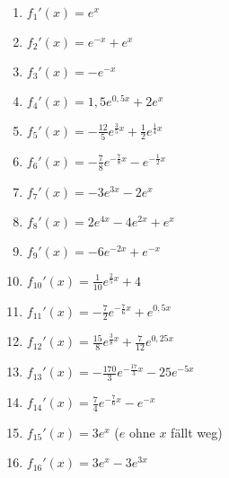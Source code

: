 \begin{Answer}[ref=efktAblA1]\\
	\begin{minipage}{\textwidth}
		\begin{minipage}{0.5\textwidth}
			\begin{enumerate}[label=\alph*)]
				\item \(f_1'(x)=e^x\)
				\item \(f_2'(x)=e^{-x}+e^x\)
				\item \(f_3'(x)=-e^{-x}\)
				\item \(f_4'(x)=1,5e^{0,5x}+2e^x\)
				\item \(f_5'(x)=-\frac{12}{5}e^{\frac{3}{5}x}+\frac{1}{2}e^{\frac{1}{4}x}\)
				\item \(f_6'(x)=-\frac{7}{8}e^{-\frac{7}{8}x}-e^{-\frac{1}{2}x}\)
				\item \(f_7'(x)=-3e^{3x}-2e^{x}\)
				\item \(f_8'(x)=2e^{4x}-4e^{2x}+e^x\)
			\end{enumerate}
		\end{minipage}
		\begin{minipage}{0.5\textwidth}
			\begin{enumerate}[label=\alph*)]
				\setcounter{enumi}{8}
				\item \(f_9'(x)=-6e^{-2x}+e^{-x}\)
				\item \(f_{10}'(x)=\frac{1}{10}e^{\frac{2}{5}x}+4\)
				\item \(f_{11}'(x)=-\frac{7}{2}e^{-\frac{7}{6}x}+e^{0,5x}\)
				\item \(f_{12}'(x)=\frac{15}{8}e^{\frac{3}{8}x}+\frac{7}{12}e^{0,25x}\)
				\item \(f_{13}'(x)=-\frac{170}{3}e^{-\frac{17}{3}x}-25e^{-5x}\)
				\item \(f_{14}'(x)=\frac{7}{4}e^{-\frac{7}{6}x}-e^{-x}\)
				\item \(f_{15}'(x)=3e^x\) (\(e\) ohne \(x\) fällt weg)
				\item \(f_{16}'(x)=3e^x-3e^{3x}\)
			\end{enumerate}
		\end{minipage}
	\end{minipage}\\  \\
\end{Answer}